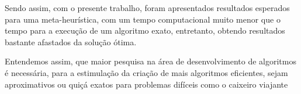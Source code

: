 Sendo assim, com o presente trabalho, foram apresentados resultados esperados para uma meta-heurística, com um tempo computacional muito menor que o tempo para a execução de um algoritmo exato, entretanto, obtendo resultados bastante afastados da solução ótima.

Entendemos assim, que maior pesquisa na área de desenvolvimento de algoritmos é necessária, para a estimulação da criação de mais algoritmos eficientes, sejam aproximativos ou quiçá exatos para problemas difíceis como o caixeiro viajante